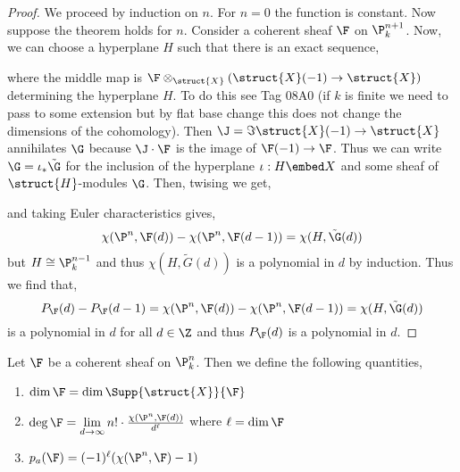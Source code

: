 \documentclass[12pt]{article}
\begin{document}
\begin{proof}
We proceed by induction on $n$. For $n = 0$ the function is constant. Now suppose the theorem holds for $n$. Consider a coherent sheaf $\F$ on $\P^{n+1}_k$. Now, we can choose a hyperplane $H$ such that there is an exact sequence,
\begin{center}
\end{center}
where the middle map is $\F \otimes_{\struct{X}} ( \struct{X}(-1) \to \struct{X} )$ determining the hyperplane $H$. To do this see Tag 08A0 (if $k$ is finite we need to pass to some extension but by flat base change this does not change the dimensions of the cohomology). Then $\J  = \Im{\struct{X}(-1) \to \struct{X}}$ annihilates $\G$ because $\J \cdot \F$ is the image of $\F(-1) \to \F$. Thus we can write $\G = \iota_* \tilde{\G}$ for the inclusion of the hyperplane $\iota : H \embed X$ and some sheaf of $\struct{H}$-modules $\G$. Then, twising we get,
\begin{center}
\end{center}
and taking Euler characteristics gives,
\[ \chi(\P^n, \F(d)) - \chi(\P^n, \F(d-1)) = \chi(H, \tilde{\G}(d)) \]
but $H \cong \P^{n-1}_k$ and thus $\chi(H, \tilde{G}(d))$ is a polynomial in $d$ by induction. Thus we find that,
\[ P_\F(d) - P_\F(d-1) = \chi(\P^n, \F(d)) - \chi(\P^n, \F(d-1)) = \chi(H, \tilde{\G}(d))  \]
is a polynomial in $d$ for all $d \in \Z$ and thus $P_\F(d)$ is a polynomial in $d$. 
\end{proof}

\begin{defn}
Let $\F$ be a coherent sheaf on $\P^n_k$. Then we define the following quantities,
\begin{enumerate}
\item $\dim{\F} = \dim{\Supp{\struct{X}}{\F}}$
\item $\deg{\F} = \lim\limits_{d \to \infty} n! \cdot \frac{\chi(\P^n, \F(d))}{d^\ell}$ where $\ell = \dim{\F}$
\item $p_a(\F) = (-1)^\ell (\chi(\P^n, \F) - 1)$
\end{enumerate}
\end{defn}
\end{document}
